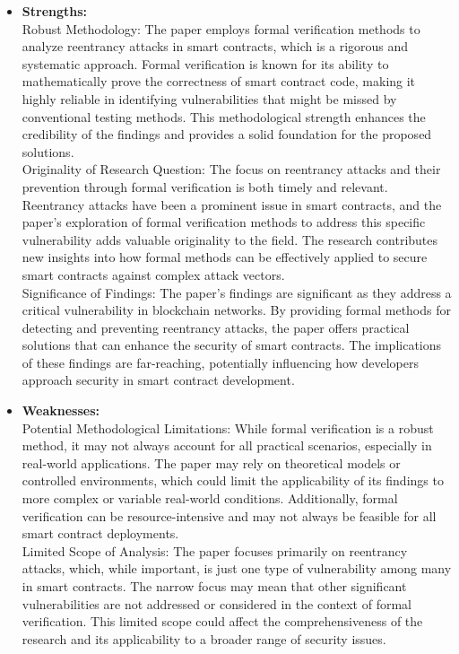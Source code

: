 \documentclass[12pt,a4paper]{article}
\begin{document}
\begin{itemize}
    \begin{itemize}
        \item \textbf{Strengths:} 
        \\ 
        Robust Methodology: The paper employs formal verification methods to analyze reentrancy attacks in smart contracts, which is a rigorous and systematic approach. Formal verification is known for its ability to mathematically prove the correctness of smart contract code, making it highly reliable in identifying vulnerabilities that might be missed by conventional testing methods. This methodological strength enhances the credibility of the findings and provides a solid foundation for the proposed solutions.
\\
Originality of Research Question: The focus on reentrancy attacks and their prevention through formal verification is both timely and relevant. Reentrancy attacks have been a prominent issue in smart contracts, and the paper’s exploration of formal verification methods to address this specific vulnerability adds valuable originality to the field. The research contributes new insights into how formal methods can be effectively applied to secure smart contracts against complex attack vectors.
\\
Significance of Findings: The paper's findings are significant as they address a critical vulnerability in blockchain networks. By providing formal methods for detecting and preventing reentrancy attacks, the paper offers practical solutions that can enhance the security of smart contracts. The implications of these findings are far-reaching, potentially influencing how developers approach security in smart contract development.
        \item \textbf{Weaknesses:} \\
        Potential Methodological Limitations: While formal verification is a robust method, it may not always account for all practical scenarios, especially in real-world applications. The paper may rely on theoretical models or controlled environments, which could limit the applicability of its findings to more complex or variable real-world conditions. Additionally, formal verification can be resource-intensive and may not always be feasible for all smart contract deployments.
\\
Limited Scope of Analysis: The paper focuses primarily on reentrancy attacks, which, while important, is just one type of vulnerability among many in smart contracts. The narrow focus may mean that other significant vulnerabilities are not addressed or considered in the context of formal verification. This limited scope could affect the comprehensiveness of the research and its applicability to a broader range of security issues.

\end{itemize}
\end{itemize}
\end{document}
